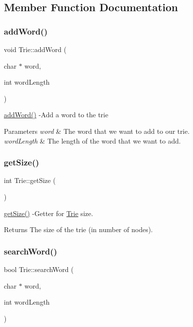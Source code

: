 \subsection{Member Function Documentation}
\mbox{\label{class_trie_ad793716c7d7e99240d6b3fa5fd1a4ff8}} 
\subsubsection{\texorpdfstring{add\+Word()}{addWord()}}
{\footnotesize\ttfamily void Trie\+::add\+Word (\begin{DoxyParamCaption}\item[{char $\ast$}]{word,  }\item[{int}]{word\+Length }\end{DoxyParamCaption})}

\hyperlink{class_trie_ad793716c7d7e99240d6b3fa5fd1a4ff8}{add\+Word()} -\/\+Add a word to the trie 
\begin{DoxyParams}{Parameters}
{\em word} & The word that we want to add to our trie. \\
\hline
{\em word\+Length} & The length of the word that we want to add. \\
\hline
\end{DoxyParams}
\mbox{\label{class_trie_aaf9bd72bfad7fa2ecfe47b7a69c05c51}} 
\subsubsection{\texorpdfstring{get\+Size()}{getSize()}}
{\footnotesize\ttfamily int Trie\+::get\+Size (\begin{DoxyParamCaption}{ }\end{DoxyParamCaption})}

\hyperlink{class_trie_aaf9bd72bfad7fa2ecfe47b7a69c05c51}{get\+Size()} -\/\+Getter for \hyperlink{class_trie}{Trie} size. \begin{DoxyReturn}{Returns}
The size of the trie (in number of nodes). 
\end{DoxyReturn}
\mbox{\label{class_trie_a3760a51720b288a6628360008977de6f}} 
\subsubsection{\texorpdfstring{search\+Word()}{searchWord()}}
{\footnotesize\ttfamily bool Trie\+::search\+Word (\begin{DoxyParamCaption}\item[{char $\ast$}]{word,  }\item[{int}]{word\+Length }\end{DoxyParamCaption})}

